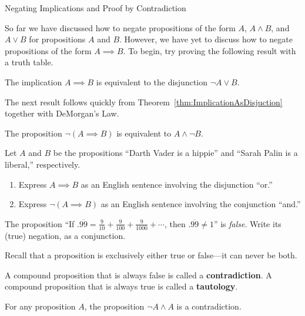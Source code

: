 \begin{section}{Negating Implications and Proof by Contradiction}

So far we have discussed how to negate propositions of the form $A$, $A\wedge B$, and $A\vee B$ for propositions $A$ and $B$.  However, we have yet to discuss how to negate propositions of the form $A\implies B$.  To begin, try proving the following result with a truth table.

\begin{theorem}\label{thm:ImplicationAsDisjuction}
The implication $A\implies B$ is equivalent to the disjunction $\neg A \vee B$.
\end{theorem}

The next result follows quickly from Theorem~\ref{thm:ImplicationAsDisjuction} together with DeMorgan's Law.

\begin{corollary}\label{cor:NegateImplication}
The proposition $\neg(A \implies B)$ is equivalent to $A \wedge \neg B$.
\end{corollary}

\begin{exercise}\label{exer:Darth Vader}
Let $A$ and $B$ be the propositions ``Darth Vader is a hippie'' and ``Sarah Palin is a liberal,'' respectively.
\begin{enumerate}[label=\textrm{(\alph*)}]
\item Express $A\implies B$ as an English sentence involving the disjunction ``or.''
\item Express $\neg(A\implies B)$ as an English sentence involving the conjunction ``and.''
\end{enumerate}
\end{exercise}

\begin{exercise}
The proposition ``If $.\overline{99}=\frac{9}{10}+\frac{9}{100}+\frac{9}{1000}+\cdots$, then $.\overline{99}\neq 1$'' is \emph{false}. Write its (true) negation, as a conjunction.
\end{exercise}

Recall that a proposition is exclusively either true or false---it can never be both.

\begin{definition}
A compound proposition that is always false is called a \textbf{contradiction}.  A compound proposition that is always true is called a \textbf{tautology}.
\end{definition}

\begin{theorem}
For any proposition $A$, the proposition $\neg A\wedge A$ is a contradiction.
\end{theorem}


\end{section}
